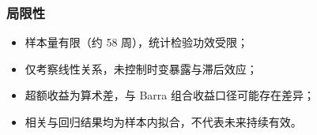 \documentclass[
]{article}
\providecommand{\tightlist}{%
  \setlength{\itemsep}{0pt}\setlength{\parskip}{0pt}}
\begin{document}
\subsubsection{局限性}\label{ux5c40ux9650ux6027}

\begin{itemize}
\tightlist
\item
  样本量有限（约 58 周），统计检验功效受限；
\item
  仅考察线性关系，未控制时变暴露与滞后效应；
\item
  超额收益为算术差，与 Barra 组合收益口径可能存在差异；
\item
  相关与回归结果均为样本内拟合，不代表未来持续有效。
\end{itemize}
\end{document}
